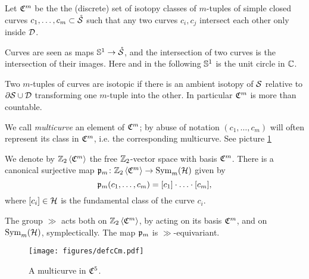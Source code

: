 \begin{defn}
\label{defn:cCm}
Let $\cC^m$ be the the (discrete) set of isotopy classes of $m$-tuples of simple closed curves $c_1,\dots,c_m\subset\mrS$
such that
 any two curves $c_i,c_j$ intersect each other only inside $\D$.
 
Curves are seen as maps $\Sone\to\mrS$, and the intersection of two curves is the intersection of their
images. Here and in the following $\Sone$ is the unit circle in $\C$.

Two $m$-tuples of curves are isotopic if there is an ambient isotopy of $\S$ relative to $\partial\S\cup\D$
transforming one $m$-tuple into the other. In particular $\cC^m$ is more than countable.

We call \emph{multicurve} an element of $\cC^m$; by abuse of notation
$(c_1,\dots,c_m)$ will often represent its class in $\cC^m$, i.e. the corresponding multicurve.
See picture \ref{fig:defcCm}

We denote by $\ZcC{m}$ the free $\Z_2$-vector space with basis $\cC^m$.
There is a canonical surjective map $\pr_m\colon\ZcC{m}\to\Sym_m(\H)$ given by
\[
 \pr_m(c_1,\dots,c_m)=[c_1]\cdot\ldots\cdot[c_m],
\]
where $[c_i]\in\H$ is the fundamental class of the curve $c_i$.

The group $\gg$ acts both on $\ZcC{m}$, by acting on its basis $\cC^m$, and
on $\Sym_m(\H)$, symplectically. The map $\pr_m$ is $\gg$-equivariant.
\end{defn}

\begin{figure}\centering
 \texttt{[image: figures/defcCm.pdf]}
 \caption{A multicurve in $\cC^5$.}
\label{fig:defcCm}
\end{figure}


